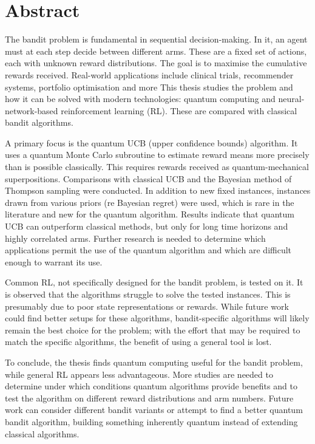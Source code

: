 
\chapter{Abstract}
The bandit problem is fundamental in sequential decision-making.
In it, an agent must at each step decide between different arms.
These are a fixed set of actions, each with unknown reward distributions.
The goal is to maximise the cumulative rewards received.
Real-world applications include clinical trials, recommender systems, portfolio optimisation and more
This thesis studies the problem and how it can be solved with modern technologies: quantum computing and neural-network-based reinforcement learning (RL).
These are compared with classical bandit algorithms.

A primary focus is the quantum UCB (upper confidence bounds) algorithm.
It uses a quantum Monte Carlo subroutine to estimate reward means more precisely than is possible classically.
This requires rewards received as quantum-mechanical superpositions.
Comparisons with classical UCB and the Bayesian method of Thompson sampling were conducted.
In addition to new fixed instances, instances drawn from various priors (re Bayesian regret) were used, which is rare in the literature and new for the quantum algorithm.
Results indicate that quantum UCB can outperform classical methods, but only for long time horizons and highly correlated arms.
Further research is needed to determine which applications permit the use of the quantum algorithm and which are difficult enough to warrant its use.

Common RL, not specifically designed for the bandit problem, is tested on it.
It is observed that the algorithms struggle to solve the tested instances.
This is presumably due to poor state representations or rewards.
While future work could find better setups for these algorithms, bandit-specific algorithms will likely remain the best choice for the problem; with the effort that may be required to match the specific algorithms, the benefit of using a general tool is lost.

To conclude, the thesis finds quantum computing useful for the bandit problem, while general RL appears less advantageous.
More studies are needed to determine under which conditions quantum algorithms provide benefits and to test the algorithm on different reward distributions and arm numbers.
Future work can consider different bandit variants or attempt to find a better quantum bandit algorithm, building something inherently quantum instead of extending classical algorithms.



\cleardoublepage